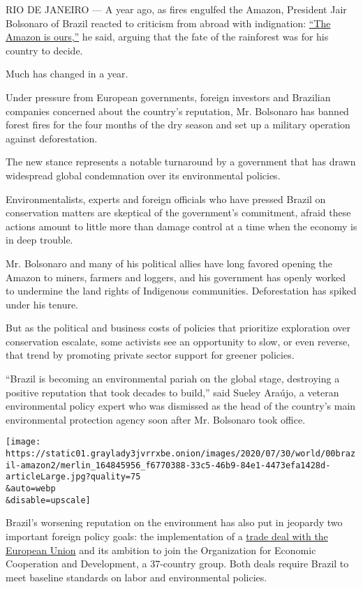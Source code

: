 RIO DE JANEIRO --- A year ago, as fires engulfed the Amazon, President
Jair Bolsonaro of Brazil reacted to criticism from abroad with
indignation:
\href{https://www.nytimes3xbfgragh.onion/2019/07/28/world/americas/brazil-deforestation-amazon-bolsonaro.html}{``The
Amazon is ours,''} he said, arguing that the fate of the rainforest was
for his country to decide.

Much has changed in a year.

Under pressure from European governments, foreign investors and
Brazilian companies concerned about the country's reputation, Mr.
Bolsonaro has banned forest fires for the four months of the dry season
and set up a military operation against deforestation.

The new stance represents a notable turnaround by a government that has
drawn widespread global condemnation over its environmental policies.

Environmentalists, experts and foreign officials who have pressed Brazil
on conservation matters are skeptical of the government's commitment,
afraid these actions amount to little more than damage control at a time
when the economy is in deep trouble.

Mr. Bolsonaro and many of his political allies have long favored opening
the Amazon to miners, farmers and loggers, and his government has openly
worked to undermine the land rights of Indigenous communities.
Deforestation has spiked under his tenure.

But as the political and business costs of policies that prioritize
exploration over conservation escalate, some activists see an
opportunity to slow, or even reverse, that trend by promoting private
sector support for greener policies.

``Brazil is becoming an environmental pariah on the global stage,
destroying a positive reputation that took decades to build,'' said
Sueley Araújo, a veteran environmental policy expert who was dismissed
as the head of the country's main environmental protection agency soon
after Mr. Bolsonaro took office.

\texttt{[image: https://static01.graylady3jvrrxbe.onion/images/2020/07/30/world/00brazil-amazon2/merlin\_164845956\_f6770388-33c5-46b9-84e1-4473efa1428d-articleLarge.jpg?quality=75\\\&auto=webp\\\&disable=upscale]}

Brazil's worsening reputation on the environment has also put in
jeopardy two important foreign policy goals: the implementation of a
\href{https://www.dw.com/en/austria-deals-first-blow-to-eu-mercosur-trade-pact/a-50489747}{trade
deal with the European Union} and its ambition to join the Organization
for Economic Cooperation and Development, a 37-country group. Both deals
require Brazil to meet baseline standards on labor and environmental
policies.

